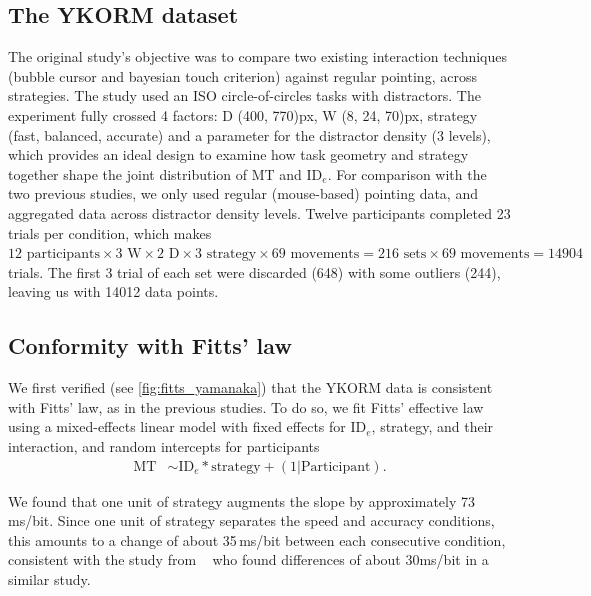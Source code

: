 \documentclass[acmlarge, manuscript,review]{acmart}
\newcommand{\mt}{\ensuremath{{\text{MT}}}\xspace}
\newcommand{\ide}{\ensuremath{{\text{ID}_e}}\xspace}
\begin{document}
\subsection{The YKORM dataset}
The original study's objective was to compare two existing interaction techniques (bubble cursor and bayesian touch criterion) against regular pointing, across strategies.
The study used an ISO circle-of-circles tasks with distractors.
The experiment fully crossed 4 factors: D (400, 770)px, W (8, 24, 70)px, strategy (fast, balanced, accurate) and a parameter for the distractor density (3 levels), which provides an ideal design to examine how task geometry and strategy together shape the joint distribution of MT and \ide.
For comparison with the two previous studies, we only used regular (mouse-based) pointing data, and aggregated data across distractor density levels.
Twelve participants completed 23 trials per condition, which makes $12 \text{ participants} \times 3 \text{ W} \times 2 \text{ D} \times 3 \text{ strategy} \times 69 \text{ movements} = 216 \text{ sets} \times 69 \text{ movements} = 14904$ trials. The first 3 trial of each set were discarded (648) with some outliers (244), leaving us with 14012 data points.

\subsection{Conformity with Fitts' law}
We first verified (see \autoref{fig:fitts_yamanaka}) that the YKORM data is consistent with Fitts' law, as in the previous studies. To do so, we fit Fitts' effective law using a mixed-effects linear model with fixed effects for \ide, strategy, and their interaction, and random intercepts for participants
\begin{align}
	\mt & \sim \ide * \text{strategy} + (1|\text{Participant}).
\end{align}





We found that one unit of strategy augments the slope by approximately 73 ms/bit. Since one unit of strategy separates the speed and accuracy conditions, this amounts to a change of about 35\,ms/bit between each consecutive condition, consistent with the study from \citeauthor{zhai2004nominal}~\cite{zhai2004nominal} who found differences of about 30ms/bit in a similar study.
\end{document}
